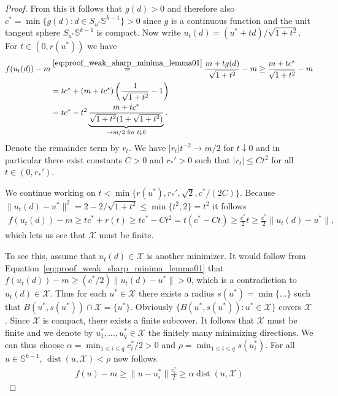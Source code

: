 \begin{proof}
    From this it follows that $g(d)>0$ and therefore also $c^{\ast}=\min\{g(d):d\in S_{u^{\ast}}\mathbb{S}^{k-1}\}>0$ since $g$ is a continuous function and the unit tangent sphere $S_{u^{\ast}}\mathbb{S}^{k-1}$ is compact. Now write $u_t(d)=(u^{\ast}+td)/\sqrt{1+t^2}$. For $t\in(0,r(u^{\ast}))$ we have
    \begin{align*}
        f(u_t(d))-m&\stackrel{\eqref{eq:proof_weak_sharp_minima_lemma01}}{=}\frac{m+tg(d)}{\sqrt{1+t^2}}-m\ge\frac{m+tc^{\ast}}{\sqrt{1+t^2}}-m\\&
        =tc^{\ast}+(m+tc^{\ast})\left(\frac{1}{\sqrt{1+t^2}}-1\right)\\&
        =tc^{\ast}-t^2\underbrace{\frac{m+tc^{\ast}}{\sqrt{1+t^2}(1+\sqrt{1+t^2})}}_{\to m/2\text{ for }t\downarrow0}.
    \end{align*}
    Denote the remainder term by $r_t$. We have $|r_t|t^{-2}\to m/2$ for $t\downarrow0$ and in particular there exist constants $C>0$ and $r_{\ast}'>0$ such that $|r_t|\le Ct^2$ for all $t\in(0,r_{\ast}')$.

    We continue working on $t<\min\{r(u^{\ast}),r_{\ast}',\sqrt{2},c^{\ast}/(2C)\}$. Because $\|u_t(d)-u^{\ast}\|^2=2-2/\sqrt{1+t^2}\le\min\{t^2,2\}=t^2$ it follows
    \begin{align}\label{eq:proof_weak_sharp_minima_lemma02}
        f(u_t(d))-m\ge tc^{\ast}+r(t)\ge tc^{\ast}-Ct^2=t(c^{\ast}-Ct)\ge\frac{c^{\ast}}{2}t\ge\frac{c^{\ast}}{2}\|u_t(d)-u^{\ast}\|,
    \end{align}
    which lets us see that $\mathcal{X}$ must be finite.

    To see this, assume that $u_t(d)\in\mathcal{X}$ is another minimizer. It would follow from Equation~\eqref{eq:proof_weak_sharp_minima_lemma01} that $f(u_t(d))-m\ge(c^{\ast}/2)\|u_t(d)-u^{\ast}\|>0$, which is a contradiction to $u_t(d)\in\mathcal{X}$. Thus for each $u^{\ast}\in\mathcal{X}$ there exists a radius $s(u^{\ast})=\min\{\dots\}$ such that $B(u^{\ast},s(u^{\ast}))\cap\mathcal{X}=\{u^{\ast}\}$. Obviously $\{B(u^{\ast},s(u^{\ast})):u^{\ast}\in\mathcal{X}\}$ covers $\mathcal{X}$. Since $\mathcal{X}$ is compact, there exists a finite subcover. It follows that $\mathcal{X}$ must be finite and we denote by $u^{\ast}_1,\dots,u^{\ast}_q\in\mathcal{X}$ the finitely many minimizing directions. We can thus choose $\alpha=\min_{1\le i\le q}c^{\ast}_i/2>0$ and $\rho=\min_{1\le i\le q}s(u^{\ast}_i)$. For all $u\in\mathbb{S}^{k-1}$, $\operatorname{dist}(u,\mathcal{X})<\rho$ now follows
    \begin{align*}
        f(u)-m\ge\|u-u_i^{\ast}\|\frac{c_i^{\ast}}{2}\ge\alpha\operatorname{dist}(u,\mathcal{X})
    \end{align*}
\end{proof}

